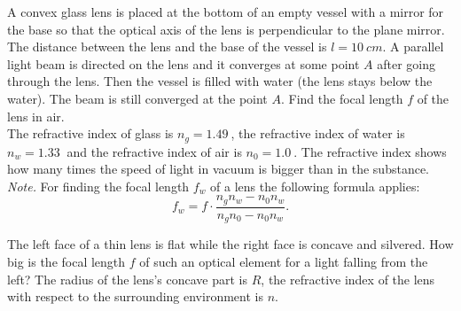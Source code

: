 \documentclass[11pt]{article}
\begin{document}

\probeng
A convex glass lens is placed at the bottom of an empty vessel with a mirror for the base so that the optical axis of the lens is perpendicular to the plane mirror. The distance between the lens and the base of the vessel is $l=\SI{10}{cm}$. A parallel light beam is directed on the lens and it converges at some point $A$ after going through the lens. Then the vessel is filled with water (the lens stays below the water). The beam is still converged at the point $A$. Find the focal length $f$ of the lens in air. \\
The refractive index of glass is $n_g = \SI{1,49}{}$, the refractive index of water is $n_w = \SI{1,33}{}$ and the refractive index of air is $n_0 = \SI{1,0}{}$. The refractive index shows how many times the speed of light in vacuum is bigger than in the substance. \\
\emph{Note.} For finding the focal length $f_w$ of a lens the following formula applies:
\[ f_w = f\cdot\frac{n_g n_w - n_0 n_w}{n_g n_0 - n_0 n_w}. \]
\probend
\bigskip


\probeng
The left face of a thin lens is flat while the right face is concave and silvered. How big is the focal length $f$ of such an optical element for a light falling from the left? The radius of the lens’s concave part is $R$, the refractive index of the lens with respect to the surrounding environment is $n$.
\begin{center}
\end{center}
\probend
\bigskip

\end{document}
